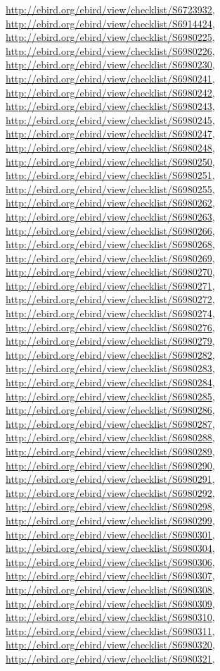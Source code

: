 \documentclass[9pt, article]{memoir}
\begin{document}
\begin{multicols}{2}
\url{http://ebird.org/ebird/view/checklist/S6723932}, 
\url{http://ebird.org/ebird/view/checklist/S6914424}, 
\url{http://ebird.org/ebird/view/checklist/S6980225}, 
\url{http://ebird.org/ebird/view/checklist/S6980226}, 
\url{http://ebird.org/ebird/view/checklist/S6980230}, 
\url{http://ebird.org/ebird/view/checklist/S6980241}, 
\url{http://ebird.org/ebird/view/checklist/S6980242}, 
\url{http://ebird.org/ebird/view/checklist/S6980243}, 
\url{http://ebird.org/ebird/view/checklist/S6980245}, 
\url{http://ebird.org/ebird/view/checklist/S6980247}, 
\url{http://ebird.org/ebird/view/checklist/S6980248}, 
\url{http://ebird.org/ebird/view/checklist/S6980250}, 
\url{http://ebird.org/ebird/view/checklist/S6980251}, 
\url{http://ebird.org/ebird/view/checklist/S6980255}, 
\url{http://ebird.org/ebird/view/checklist/S6980262}, 
\url{http://ebird.org/ebird/view/checklist/S6980263}, 
\url{http://ebird.org/ebird/view/checklist/S6980266}, 
\url{http://ebird.org/ebird/view/checklist/S6980268}, 
\url{http://ebird.org/ebird/view/checklist/S6980269}, 
\url{http://ebird.org/ebird/view/checklist/S6980270}, 
\url{http://ebird.org/ebird/view/checklist/S6980271}, 
\url{http://ebird.org/ebird/view/checklist/S6980272}, 
\url{http://ebird.org/ebird/view/checklist/S6980274}, 
\url{http://ebird.org/ebird/view/checklist/S6980276}, 
\url{http://ebird.org/ebird/view/checklist/S6980279}, 
\url{http://ebird.org/ebird/view/checklist/S6980282}, 
\url{http://ebird.org/ebird/view/checklist/S6980283}, 
\url{http://ebird.org/ebird/view/checklist/S6980284}, 
\url{http://ebird.org/ebird/view/checklist/S6980285}, 
\url{http://ebird.org/ebird/view/checklist/S6980286}, 
\url{http://ebird.org/ebird/view/checklist/S6980287}, 
\url{http://ebird.org/ebird/view/checklist/S6980288}, 
\url{http://ebird.org/ebird/view/checklist/S6980289}, 
\url{http://ebird.org/ebird/view/checklist/S6980290}, 
\url{http://ebird.org/ebird/view/checklist/S6980291}, 
\url{http://ebird.org/ebird/view/checklist/S6980292}, 
\url{http://ebird.org/ebird/view/checklist/S6980298}, 
\url{http://ebird.org/ebird/view/checklist/S6980299}, 
\url{http://ebird.org/ebird/view/checklist/S6980301}, 
\url{http://ebird.org/ebird/view/checklist/S6980304}, 
\url{http://ebird.org/ebird/view/checklist/S6980306}, 
\url{http://ebird.org/ebird/view/checklist/S6980307}, 
\url{http://ebird.org/ebird/view/checklist/S6980308}, 
\url{http://ebird.org/ebird/view/checklist/S6980309}, 
\url{http://ebird.org/ebird/view/checklist/S6980310}, 
\url{http://ebird.org/ebird/view/checklist/S6980311}, 
\url{http://ebird.org/ebird/view/checklist/S6980320}, 
\url{http://ebird.org/ebird/view/checklist/S6980321}, 

\end{multicols}
\end{document}
